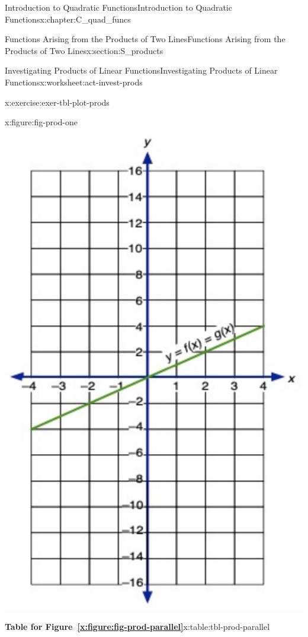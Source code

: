 \documentclass[oneside,10pt,]{book}
\newcommand{\tabularfont}{\relax}
\newcommand{\xreffont}{\relax}
\numberwithin{equation}{chapter}
\newcommand{\hrulethin}  {\noalign{\hrule height 0.04em}}
\begin{document}
\begin{chapterptx}{Introduction to Quadratic Functions}{}{Introduction to Quadratic Functions}{}{}{x:chapter:C_quad_funcs}
\begin{sectionptx}{Functions Arising from the Products of Two Lines}{}{Functions Arising from the Products of Two Lines}{}{}{x:section:S_products}
\begin{worksheet-subsection}{Investigating Products of Linear Functions}{}{Investigating Products of Linear Functions}{}{}{x:worksheet:act-invest-prods}
\begin{divisionexercise}{1}{}{}{x:exercise:exer-tbl-plot-prods}
\begin{sidebyside}{3}{0}{0}{0}
\begin{sbspanel}{0.333333333333333}
\begin{figureptx}{}{x:figure:fig-prod-one}{}
\includegraphics[width=\linewidth]{external/prod-one.pdf}
\tcblower
\end{figureptx}%
\end{sbspanel}%
\end{sidebyside}%
 \begin{sidebyside}{2}{0}{0}{0}%
\begin{sbspanel}{0.5}%
\begin{tableptx}{\textbf{Table for Figure~{\xreffont\ref*{x:figure:fig-prod-parallel}}}}{x:table:tbl-prod-parallel}{}%
\resizebox{\ifdim\width > \linewidth\linewidth\else\width\fi}{!}{%
{\centering%
{\tabularfont%
\begin{tabular}{Acccc}\hrulethin

\end{tabular}}}}
\end{tableptx}
\end{sbspanel}
\end{sidebyside}
\end{divisionexercise}
\end{worksheet-subsection}
\end{sectionptx}
\end{chapterptx}
\end{document}

